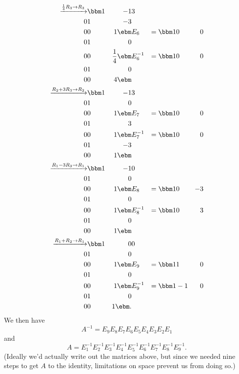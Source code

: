 \begin{minipage}{\specialboxlength}
{\begin{align*}
\xrightarrow{\frac{1}{4}R_3\to R_3}& \bbm 1&-1&3\\0&1&-3\\0&0&1\ebm & E_6 & = \bbm 1&0&0\\0&1&0\\0&0&\frac{1}{4}\ebm & E_6^{-1} & = \bbm 1&0&0\\0&1&0\\0&0&4\ebm\\
\xrightarrow{R_2+3R_3\to R_2} & \bbm 1&-1&3\\0&1&0\\0&0&1\ebm & E_7 & = \bbm 1&0&0\\0&1&3\\ 0&0&1\ebm & E_7^{-1} & = \bbm 1&0&0\\0&1&-3\\0&0&1\ebm\\
\xrightarrow{R_1-3R_3\to R_1}& \bbm 1&-1&0\\0&1&0\\0&0&1\ebm & E_8 & = \bbm 1&0&-3\\0&1&0\\0&0&1\ebm & E_8^{-1} & = \bbm 1&0&3\\0&1&0\\0&0&1\ebm\\
\xrightarrow{R_1+R_2\to R_1}& \bbm 1&0&0\\0&1&0\\0&0&1\ebm & E_9 &= \bbm 1&1&0\\0&1&0\\0&0&1\ebm & E_9^{-1} & = \bbm 1&-1&0\\0&1&0\\0&0&1\ebm.
\end{align*}
We then have
\[
A^{-1} = E_9E_8E_7E_6E_5E_4E_3E_2E_1
\]
and
\[
A = E_1^{-1}E_2^{-1}E_3^{-1}E_4^{-1}E_5^{-1}E_6^{-1}E_7^{-1}E_8^{-1}E_9^{-1}.
\]
(Ideally we'd actually write out the matrices above, but since we needed nine steps to get $A$ to the identity, limitations on space prevent us from doing so.) 
}
\end{minipage}\\
\restoreboxwidth

